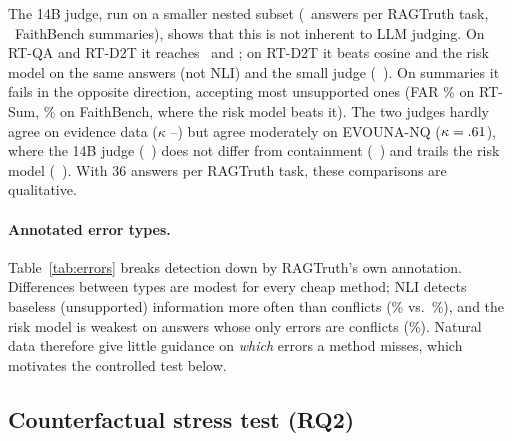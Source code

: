 The 14B judge, run on a smaller nested subset (\QaJudgeStrongN\ answers per RAGTruth task, \FbJudgeStrongN\ FaithBench summaries), shows that this is not inherent to LLM judging. On RT-QA and RT-D2T it reaches \QaJudgeStrongBacc\ and \DttJudgeStrongBacc; on RT-D2T it beats cosine and the risk model on the same answers (not NLI) and the small judge (\DttStrongMinusSmall\ \DttStrongMinusSmallCi). On summaries it fails in the opposite direction, accepting most unsupported ones (FAR \SumJudgeStrongFar\% on RT-Sum, \FbJudgeStrongFar\% on FaithBench, where the risk model beats it). The two judges hardly agree on evidence data ($\kappa$ \SumJudgeKappa--\QaJudgeKappa) but agree moderately on EVOUNA-NQ ($\kappa=.61$), where the 14B judge (\EvJudgeStrongBacc\ \EvJudgeStrongBaccCi) does not differ from containment (\EvContainMinusStrong\ \EvContainMinusStrongCi) and trails the risk model (\EvRiskMinusStrong\ \EvRiskMinusStrongCi). With 36 answers per RAGTruth task, these comparisons are qualitative.

\begin{table}[t]
\centering\small

\caption{Detection rate (\%, flagged at $\tau^\mathrm{bal}$) of human-annotated RAGTruth hallucinations by annotated type; an answer can carry several types. Judge rates are on the judged subset, with $n$ in parentheses.}
\label{tab:errors}
\end{table}

\paragraph{Annotated error types.} Table~\ref{tab:errors} breaks detection down by RAGTruth's own annotation. Differences between types are modest for every cheap method; NLI detects baseless (unsupported) information more often than conflicts (\ErrBaselessOnlyNli\% vs.\ \ErrConflictOnlyNli\%), and the risk model is weakest on answers whose only errors are conflicts (\ErrConflictOnlyRisk\%). Natural data therefore give little guidance on \emph{which} errors a method misses, which motivates the controlled test below.

\subsection{Counterfactual stress test (RQ2)}
\label{sec:res-cf}

\begin{table}[t]
\centering\small
\resizebox{\textwidth}{!}{}
\caption{Counterfactual pairs: share of flips that lower the support score (\%) by perturbation type, over all \NCfPairs\ pairs; ``Inv.'' is the inversion rate (\%) on the \NCfInv\ matched-locus triplets with a paraphrase, i.e.\ how often the flip scores at least as high as the paraphrase of the same sentence; ``Para.\ $\Delta$'' is the mean absolute score change caused by the paraphrase in calibration-set standard deviations.}
\label{tab:cfdrop}
\end{table}

